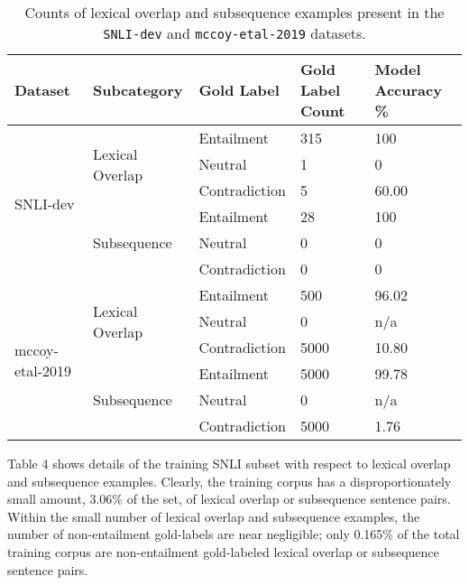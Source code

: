 \documentclass[11pt,a4paper]{article}
\begin{document}
\begin{table}[hbt!]
\begin{center}
\begin{tabular}
{p{}|p{} p{} p{} p{} }
  \hline
   {\tiny \textbf{Dataset}} & {\tiny \textbf{Subcategory}} & {\tiny \textbf{Gold Label}} & {\tiny \textbf{Gold Label Count}} & {\tiny \textbf{Model Accuracy} {\%}} \\
  \hline
  \multirow{6}{*}{\tiny SNLI-dev} & \multirow{3}{*}{\tiny Lexical Overlap} & {\tiny Entailment} & {\tiny 315} & {\tiny 100} \\
  & & {\tiny Neutral} & {\tiny 1} & {\tiny 0} \\
  & & {\tiny Contradiction} & {\tiny 5} & {\tiny 60.00} \\
  \cline{2-5}
  & \multirow{3}{*}{\tiny Subsequence} & {\tiny Entailment} & {\tiny 28} & {\tiny 100} \\
  & & {\tiny Neutral} & {\tiny 0} & {\tiny 0} \\
  & & {\tiny Contradiction} & {\tiny 0} & {\tiny 0} \\

  \bottomrule

  \multirow{6}{*}{\tiny mccoy-etal-2019} & \multirow{3}{*}{\tiny Lexical Overlap} & {\tiny Entailment} & {\tiny 500} & {\tiny 96.02} \\
  & & {\tiny Neutral} & {\tiny 0} & {\tiny n/a} \\
  & & {\tiny Contradiction} & {\tiny 5000} & {\tiny 10.80} \\
  \cline{2-5}
  & \multirow{3}{*}{\tiny Subsequence} & {\tiny Entailment} & {\tiny 5000} & {\tiny 99.78} \\
  & & {\tiny Neutral} & {\tiny 0} & {\tiny n/a} \\
  & & {\tiny Contradiction} & {\tiny 5000} & {\tiny 1.76} \\
\end{tabular}
\end{center}
\caption{Counts of lexical overlap and subsequence examples present in the \texttt{SNLI-dev} and \texttt{mccoy-etal-2019} datasets.}
\end{table}

Table 4 shows details of the training SNLI subset with respect to lexical overlap and subsequence examples. Clearly, the training corpus has a disproportionately small amount, 3.06\% of the set, of lexical overlap or subsequence sentence pairs. Within the small number of lexical overlap and subsequence examples, the number of non-entailment gold-labels are near negligible; only 0.165\% of the total training corpus are non-entailment gold-labeled lexical overlap or subsequence sentence pairs.
\end{document}
